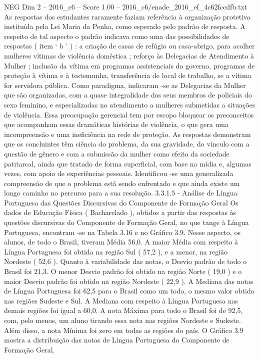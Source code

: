 \begin{textsample}{NEG Dim 2 – 2016\_c6 – Score 1.00 – 2016\_c6/enade\_2016\_ef\_4c62fccdfb.txt}
As respostas dos estudantes raramente faziam referência à organização protetiva instituída pela Lei Maria da Penha, como esperado pelo padrão de resposta.
A respeito de tal aspecto o padrão indicava como uma das possibilidades de respostas ( item ‘ b ’ ) : a criação de casas de refúgio ou casa-abrigo, para acolher mulheres vítimas de violência doméstica ; reforço às Delegacias de Atendimento à Mulher ; inclusão da vítima em programas assistenciais do governo, programas de proteção à vítima e à testemunha, transferência de local de trabalho, se a vítima for servidora pública.
Como paradigma, indicaram -se as Delegacias da Mulher que são organizadas, com a quase integralidade dos seus membros de policiais do sexo feminino, e especializadas no atendimento a mulheres submetidas a situações de violência.
Essa preocupação gerencial tem por escopo bloquear os preconceitos que acompanham essas dramáticas histórias de violência, o que gera uma incompreensão e uma ineficiência na rede de proteção.
As respostas demonstram que os concluintes têm ciência do problema, da sua gravidade, do vínculo com a questão de gênero e com a submissão da mulher como efeito da sociedade patriarcal, ainda que tratado de forma superficial, com base na mídia e, algumas vezes, com apoio de experiências pessoais.
Identificou -se uma generalizada compreensão de que o problema está sendo enfrentado e que ainda existe um longo caminho no percurso para a sua resolução. 3.3.1.5 - Análise de Língua Portuguesa das Questões Discursivas do Componente de Formação Geral Os dados de Educação Física ( Bacharelado ), obtidos a partir das respostas às questões discursivas do Componente de Formação Geral, no que tange à Língua Portuguesa, encontram -se na Tabela 3.16 e no Gráfico 3.9.
Nesse aspecto, os alunos, de todo o Brasil, tiveram Média 56,0.
A maior Média com respeito à Língua Portuguesa foi obtida na região Sul ( 57,2 ), e a menor, na região Nordeste ( 52,6 ).
Quanto à variabilidade das notas, o Desvio padrão de todo o Brasil foi 21,3.
O menor Desvio padrão foi obtido na região Norte ( 19,0 ) e o maior Desvio padrão foi obtido na região Nordeste ( 22,9 ).
A Mediana das notas de Língua Portuguesa foi 62,5 para o Brasil como um todo, o mesmo valor obtido nas regiões Sudeste e Sul.
A Mediana com respeito à Língua Portuguesa nas demais regiões foi igual a 60,0.
A nota Máxima para todo o Brasil foi de 92,5, com, pelo menos, um aluno tirando essa nota nas regiões Nordeste e Sudeste.
Além disso, a nota Mínima foi zero em todas as regiões do país.
O Gráfico 3.9 mostra a distribuição das notas de Língua Portuguesa do Componente de Formação Geral.

\end{textsample}
